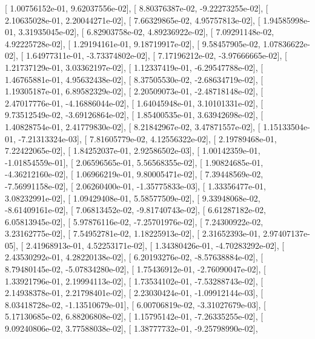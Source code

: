 \documentclass{article}
\begin{document}
       [  1.00756152e-01,   9.62037556e-02],
       [  8.80376387e-02,  -9.22273255e-02],
       [  2.10635028e-01,   2.20044271e-02],
       [  7.66329865e-02,   4.95757813e-02],
       [  1.94585998e-01,   3.31935045e-02],
       [  6.82903758e-02,   4.89236922e-02],
       [  7.09291148e-02,   4.92225728e-02],
       [  1.29194161e-01,   9.18719917e-02],
       [  9.58457905e-02,   1.07836622e-02],
       [  1.64977311e-01,  -3.73374802e-02],
       [  7.17196212e-02,  -3.97666665e-02],
       [  1.21737129e-01,   3.03362197e-02],
       [  1.12337419e-01,  -6.29547788e-02],
       [  1.46765881e-01,   4.95632438e-02],
       [  8.37505530e-02,  -2.68634719e-02],
       [  1.19305187e-01,   6.89582329e-02],
       [  2.20509073e-01,  -2.48718148e-02],
       [  2.47017776e-01,  -4.16886044e-02],
       [  1.64045948e-01,   3.10101331e-02],
       [  9.73512549e-02,  -3.69126864e-02],
       [  1.85400535e-01,   3.63942698e-02],
       [  1.40828754e-01,   2.41779830e-02],
       [  8.21842967e-02,   3.47871557e-02],
       [  1.15133504e-01,  -7.21313324e-03],
       [  7.81605779e-02,   4.12556322e-02],
       [  2.19789468e-01,   7.22422065e-02],
       [  1.84252037e-01,   2.92586502e-03],
       [  1.00142359e-01,  -1.01854559e-01],
       [  2.06596565e-01,   5.56568355e-02],
       [  1.90824685e-01,  -4.36212160e-02],
       [  1.06966219e-01,   9.80005471e-02],
       [  7.39448569e-02,  -7.56991158e-02],
       [  2.06260400e-01,  -1.35775833e-03],
       [  1.33356477e-01,   3.08232991e-02],
       [  1.09429408e-01,   5.58577509e-02],
       [  9.33948068e-02,  -8.61409161e-02],
       [  7.06813452e-02,  -9.81740743e-02],
       [  6.61287182e-02,   6.05813945e-02],
       [  5.97876116e-02,  -7.25701976e-02],
       [  7.24300922e-02,   3.23162775e-02],
       [  7.54952781e-02,   1.18225913e-02],
       [  2.31652393e-01,   2.97407137e-05],
       [  2.41968913e-01,   4.52253171e-02],
       [  1.34380426e-01,  -4.70283292e-02],
       [  2.43530292e-01,   4.28220138e-02],
       [  6.20193276e-02,  -8.57638884e-02],
       [  8.79480145e-02,  -5.07834280e-02],
       [  1.75436912e-01,  -2.76090047e-02],
       [  1.33921796e-01,   2.19994113e-02],
       [  1.73534102e-01,  -7.53288743e-02],
       [  2.14938378e-01,   2.21798401e-02],
       [  2.23030424e-01,  -1.09912144e-03],
       [  8.03418728e-02,  -1.13510679e-01],
       [  6.00706819e-02,  -3.31027679e-03],
       [  5.17130685e-02,   6.88206808e-02],
       [  1.15795142e-01,  -7.26335255e-02],
       [  9.09240806e-02,   3.77588038e-02],
       [  1.38777732e-01,  -9.25798990e-02],
\end{document}

